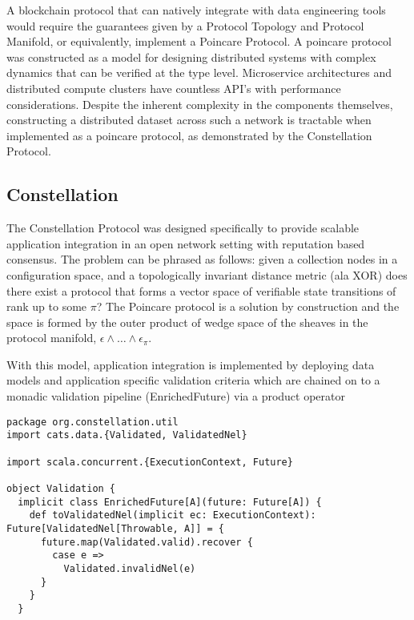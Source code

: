 \documentclass{article}
\begin{document}
A blockchain protocol that can natively integrate with data engineering tools would require the guarantees given by a Protocol Topology and Protocol Manifold, or equivalently, implement a Poincare Protocol. A poincare protocol was constructed as a model for designing distributed systems with complex dynamics that can be verified at the type level. Microservice architectures and distributed compute clusters have countless API's with performance considerations. Despite the inherent complexity in the components themselves, constructing a distributed dataset across such a network is tractable when implemented as a poincare protocol, as demonstrated by the Constellation Protocol.

\subsection{Constellation} 
The Constellation Protocol was designed specifically to provide scalable application integration in an open network setting with reputation based consensus. The problem can be phrased as follows: given a collection nodes in a configuration space, and a topologically invariant distance metric (ala XOR) does there exist a protocol that forms a vector space of verifiable state transitions of rank up to some $\pi$? The Poincare protocol is a solution by construction and the space is formed by the outer product of wedge space of the sheaves in the protocol manifold, $\epsilon \wedge \dots \wedge \epsilon_\pi$.

With this model, application integration is implemented by deploying data models and application specific validation criteria which are chained on to a monadic validation pipeline (EnrichedFuture) via a product operator 

\begin{lstlisting}[style=myScalastyle]
package org.constellation.util
import cats.data.{Validated, ValidatedNel}

import scala.concurrent.{ExecutionContext, Future}

object Validation {
  implicit class EnrichedFuture[A](future: Future[A]) {
    def toValidatedNel(implicit ec: ExecutionContext): Future[ValidatedNel[Throwable, A]] = {
      future.map(Validated.valid).recover {
        case e =>
          Validated.invalidNel(e)
      }
    }
  }
\end{lstlisting}
\end{document}
